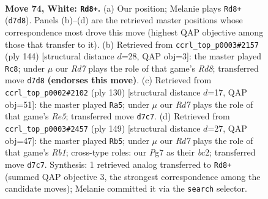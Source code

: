 \documentclass[11pt]{article}
\begin{document}
\clearpage

\begin{figure}[p]\centering
\begin{subfigure}{0.46\textwidth}\centering
\resizebox{\linewidth}{!}{%
\newchessgame
\chessboard[
  setfen={6k1/3R2P1/8/8/p1p5/PrP4p/7P/6K1 w - - 1 74},
  showmover=false,
  pgfstyle=straightmove, color=movearrow, markmove={d7-d8}
]}
\caption{}
\end{subfigure}\hfill
\begin{subfigure}{0.46\textwidth}\centering
\resizebox{\linewidth}{!}{%
\newchessgame
\chessboard[
  setfen={3R4/5k2/6p1/5pP1/5P1p/4P1r1/5K2/8 w - - 6 73},
  showmover=false,
  pgfstyle=straightmove, color=movearrow, markmove={d8-c8}
]}
\caption{}
\end{subfigure}
\\[4pt]
\begin{subfigure}{0.46\textwidth}\centering
\resizebox{\linewidth}{!}{%
\newchessgame
\chessboard[
  setfen={5k2/7p/5P2/4R1P1/p1p4p/Pr6/1P5K/8 w - - 2 66},
  showmover=false,
  pgfstyle=straightmove, color=movearrow, markmove={e5-a5}
]}
\caption{}
\end{subfigure}\hfill
\begin{subfigure}{0.46\textwidth}\centering
\resizebox{\linewidth}{!}{%
\newchessgame
\chessboard[
  setfen={1r6/4b1k1/3pP3/3P4/1pR5/1Pp1K3/2B5/8 b - - 21 75},
  showmover=false,
  pgfstyle=straightmove, color=movearrow, markmove={b8-b5}
]}
\caption{}
\end{subfigure}
\caption{\textbf{Move 74, White: \texttt{Rd8+}.} (a) Our position; Melanie plays \texttt{Rd8+} (\texttt{d7d8}). Panels (b)--(d) are the retrieved master positions whose correspondence most drove this move (highest QAP objective among those that transfer to it). (b) Retrieved from \texttt{ccrl\_top\_p0003\#2157} (ply 144) [structural distance $d$=28, QAP obj=3]: the master played \texttt{Rc8}; under $\mu$ our \emph{Rd7} plays the role of that game's \emph{Rd8}; transferred move \texttt{d7d8} \textbf{(endorses this move)}. (c) Retrieved from \texttt{ccrl\_top\_p0002\#2102} (ply 130) [structural distance $d$=17, QAP obj=51]: the master played \texttt{Ra5}; under $\mu$ our \emph{Rd7} plays the role of that game's \emph{Re5}; transferred move \texttt{d7c7}. (d) Retrieved from \texttt{ccrl\_top\_p0003\#2457} (ply 149) [structural distance $d$=27, QAP obj=47]: the master played \texttt{Rb5}; under $\mu$ our \emph{Rd7} plays the role of that game's \emph{Rb1}; cross-type roles: our \emph{P}g7 as their \emph{b}c2; transferred move \texttt{d7c7}. Synthesis: 1 retrieved analog transferred to \texttt{Rd8+} (summed QAP objective 3, the strongest correspondence among the candidate moves); Melanie committed it via the \texttt{search} selector.}
\label{fig:thought-m146}
\end{figure}
\end{document}
